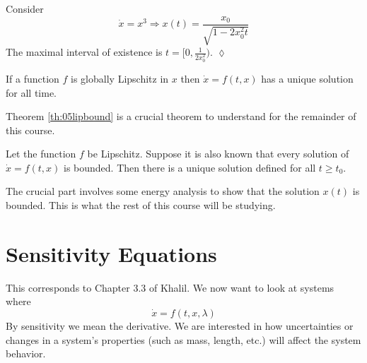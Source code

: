 \begin{example}
Consider
$$\dot{x} = x^3 \Rightarrow x(t) = \frac{x_0}{\sqrt{1-2x_0^2t}}$$
The maximal interval of existence is $t=[0,\frac{1}{2x_0^2})$.
$\lozenge$
\end{example}

\begin{theorem}
If a function $f$ is globally Lipschitz in $x$ then $\dot{x}=f(t,x)$ has a unique solution for all time.
\end{theorem}

Theorem \ref{th:05lipbound} is a crucial theorem to understand for the remainder of this course.
\begin{theorem}
\label{th:05lipbound}
Let the function $f$ be Lipschitz. Suppose it is also known that every solution of $\dot{x}=f(t,x)$ is bounded. Then there is a unique solution defined for all $t\geq t_0$.
\end{theorem}

The crucial part involves some energy analysis to show that the solution $x(t)$ is bounded. This is what the rest of this course will be studying.

\section{Sensitivity Equations}
This corresponds to Chapter 3.3 of Khalil. We now want to look at systems where
$$\dot{x} = f(t,x,\lambda)$$
By sensitivity we mean the derivative. We are interested in how uncertainties or changes in a system's properties (such as mass, length, etc.) will affect the system behavior.
